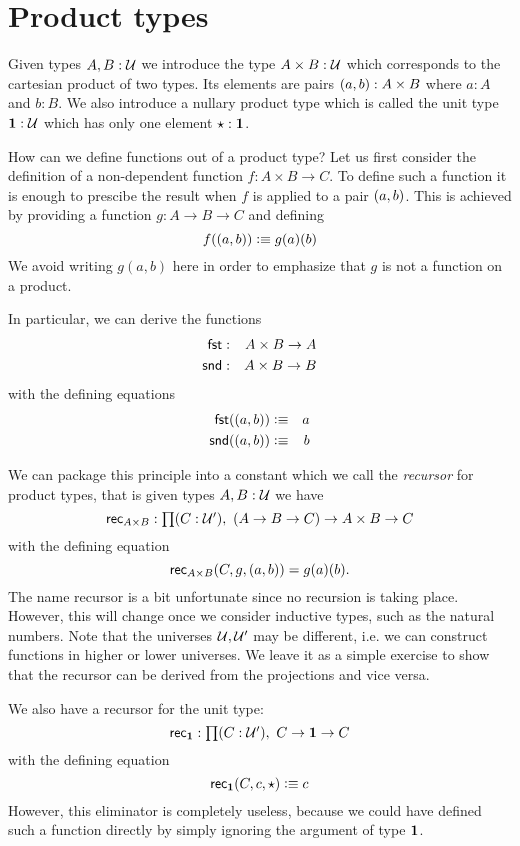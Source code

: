\section{Product types}
\label{sec:finite-product-types}

Given types $A,B:\mathcal{U}$ we introduce the type $A\times B:\mathcal{U}$ which
corresponds to the cartesian product of two types. Its elements are
pairs $( a,b) : A \times B$ where $a:A$ and $b:B$. We also
introduce a nullary product type which is called the unit type $\mathbf{1}
: \mathcal{U}$ which has only one element $\star : \mathbf{1}$.

How can we define functions out of a product type? Let us first
consider the definition of a non-dependent function $f : A\times B \to
C$. To define such a function it is enough to prescibe the result
when $f$ is applied to a pair $( a,b)$.  This is achieved by
providing a function $g : A \to B \to C$ and defining
\[ f(( a,b)) \vcentcolon\equiv g(a)(b) \]
We avoid writing $g(a,b)$ here in order to emphasize that $g$ is not a
function on a product. 

In particular, we can derive the functions
\begin{eqnarray*}
  \mathsf{fst} & : & A \times B \to A \\
  \mathsf{snd} & : & A \times B \to B
\end{eqnarray*}
with the defining equations 
\begin{eqnarray*}
  \mathsf{fst}(( a,b)) & \vcentcolon\equiv & a \\
  \mathsf{snd}(( a,b)) & \vcentcolon\equiv & b
\end{eqnarray*}

We can package this principle into a constant which we call the
\emph{recursor} for product
types, that is given types $A,B : \mathcal{U}$ we have
\[\rec{A\times B} : \prd{C:\UU'}(A \to B \to C) \to A \times B \to C\]
with the defining equation
\[\mathsf{rec}_{A\times B}(C,g,( a,b)) = g(a)(b). \]
The name recursor is a bit unfortunate since no recursion is taking
place. However, this will change once we consider inductive types, such as
the natural numbers.
Note that the universes $\mathcal{U},\mathcal{U}'$ may be different, i.e. we can
construct functions in higher or lower universes. 
We leave it as a simple exercise to show that the recursor can be
derived from the projections and vice versa.

We also have a recursor for the unit type:
\[\rec{\unit} : \prd{C:\UU'}C \to \unit \to C\]
with the defining equation
\[ \mathsf{rec}_{\mathbf{1}}(C,c,\star) \vcentcolon\equiv c \]
However, this eliminator is completely useless,
because we could have defined such a function directly
by simply ignoring the argument of type $\mathbf{1}$.

